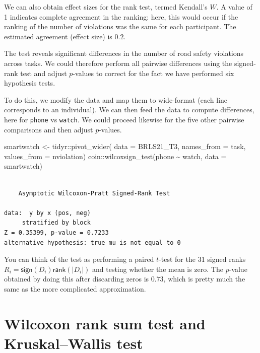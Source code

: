 \documentclass[
  11pt,
  letterpaper,
]{scrbook}
\newenvironment{Shaded}{\begin{snugshade}}{\end{snugshade}}
\newcommand{\AttributeTok}[1]{\textcolor[rgb]{0.40,0.45,0.13}{#1}}
\newcommand{\FunctionTok}[1]{\textcolor[rgb]{0.28,0.35,0.67}{#1}}
\newcommand{\NormalTok}[1]{\textcolor[rgb]{0.00,0.23,0.31}{#1}}
\newcommand{\OtherTok}[1]{\textcolor[rgb]{0.00,0.23,0.31}{#1}}
\newcommand{\SpecialCharTok}[1]{\textcolor[rgb]{0.37,0.37,0.37}{#1}}
\theoremstyle{definition}
\theoremstyle{remark}
\begin{document}
We can also obtain effect sizes for the rank test, termed Kendall's
\(W\). A value of 1 indicates complete agreement in the ranking: here,
this would occur if the ranking of the number of violations was the same
for each participant. The estimated agreement (effect size) is \(0.2\).

The test reveals significant differences in the number of road safety
violations across tasks. We could therefore perform all pairwise
differences using the signed-rank test and adjust \(p\)-values to
correct for the fact we have performed six hypothesis tests.

To do this, we modify the data and map them to wide-format (each line
corresponds to an individual). We can then feed the data to compute
differences, here for \texttt{phone} vs \texttt{watch}. We could proceed
likewise for the five other pairwise comparisons and then adjust
\(p\)-values.

\begin{Shaded}
\begin{Highlighting}[]
\NormalTok{smartwatch }\OtherTok{\textless{}{-}}\NormalTok{ tidyr}\SpecialCharTok{::}\FunctionTok{pivot\_wider}\NormalTok{(}
  \AttributeTok{data =}\NormalTok{ BRLS21\_T3,}
  \AttributeTok{names\_from =}\NormalTok{ task,}
  \AttributeTok{values\_from =}\NormalTok{ nviolation)}
\NormalTok{coin}\SpecialCharTok{::}\FunctionTok{wilcoxsign\_test}\NormalTok{(phone }\SpecialCharTok{\textasciitilde{}}\NormalTok{ watch,}
                      \AttributeTok{data =}\NormalTok{ smartwatch)}
\end{Highlighting}
\end{Shaded}

\begin{verbatim}

    Asymptotic Wilcoxon-Pratt Signed-Rank Test

data:  y by x (pos, neg) 
     stratified by block
Z = 0.35399, p-value = 0.7233
alternative hypothesis: true mu is not equal to 0
\end{verbatim}

You can think of the test as performing a paired \(t\)-test for the 31
signed ranks \(R_i =\mathsf{sign}(D_i) \mathsf{rank}(|D_i|)\) and
testing whether the mean is zero. The \(p\)-value obtained by doing this
after discarding zeros is \(0.73\), which is pretty much the same as the
more complicated approximation.

\hypertarget{wilcoxon-rank-sum-test-and-kruskalwallis-test}{%
\section{Wilcoxon rank sum test and Kruskal--Wallis
test}\label{wilcoxon-rank-sum-test-and-kruskalwallis-test}}
\end{document}
